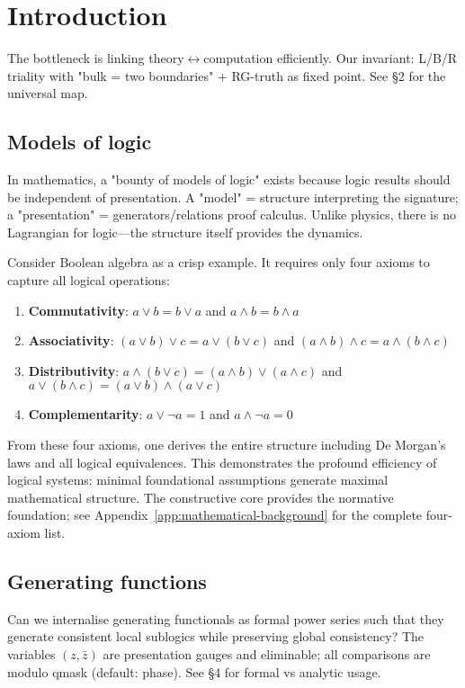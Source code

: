 \section{Introduction}
\label{sec:introduction}

The bottleneck is linking theory$\leftrightarrow$computation efficiently. Our invariant: L/B/R triality with "bulk = two boundaries" + RG-truth as fixed point. See §2 for the universal map.  

 
\subsection{Models of logic}

In mathematics, a "bounty of models of logic" exists because logic results should be independent of presentation. A "model" = structure interpreting the signature; a "presentation" = generators/relations proof calculus. Unlike physics, there is no Lagrangian for logic—the structure itself provides the dynamics.

Consider Boolean algebra as a crisp example. It requires only four axioms to capture all logical operations:
\begin{enumerate}
\item \textbf{Commutativity}: $a \vee b = b \vee a$ and $a \wedge b = b \wedge a$
\item \textbf{Associativity}: $(a \vee b) \vee c = a \vee (b \vee c)$ and $(a \wedge b) \wedge c = a \wedge (b \wedge c)$
\item \textbf{Distributivity}: $a \wedge (b \vee c) = (a \wedge b) \vee (a \wedge c)$ and $a \vee (b \wedge c) = (a \vee b) \wedge (a \vee c)$
\item \textbf{Complementarity}: $a \vee \neg a = 1$ and $a \wedge \neg a = 0$
\end{enumerate}

From these four axioms, one derives the entire structure including De Morgan's laws and all logical equivalences. This demonstrates the profound efficiency of logical systems: minimal foundational assumptions generate maximal mathematical structure. The constructive core provides the normative foundation; see Appendix~\ref{app:mathematical-background} for the complete four-axiom list.


\subsection{Generating functions}

Can we internalise generating functionals as formal power series such that they generate consistent local sublogics while preserving global consistency? The variables $(z,\bar z)$ are presentation gauges and eliminable; all comparisons are modulo qmask (default: phase). See §4 for formal vs analytic usage.

